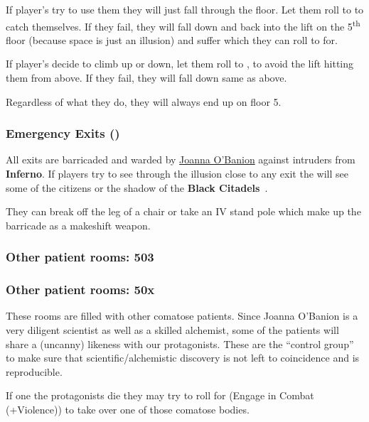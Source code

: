 \documentclass[bg-full]{resources/stylesheets/kult}
\begin{document}
If player's try to use them they will just fall through the floor.  Let them roll to  to catch
themselves.  If they fail, they will fall down and back into the lift on the 5\textsuperscript{th} floor (because space is
just an illusion) and suffer  which they can roll to  for.

If player's decide to climb up or down, let them roll to , to avoid the lift hitting them from
above.  If they fail, they will fall down same as above.

Regardless of what they do, they will always end up on floor 5.

\subsubsection{Emergency Exits (\faLock)}%
\label{ssub:emergency_exits}

All exits are barricaded and warded by \hyperref[ssub:joanna_o_banion]{Joanna O'Banion} against intruders from \textbf{Inferno}.
If players try to see through the illusion close to any exit the will see some of the citizens or the shadow of the
\textbf{Black Citadels}~\cite[p.316]{KULT:core}.

They can break off the leg of a chair or take an IV stand pole which make up the barricade as a makeshift weapon.

\subsubsection{Other patient rooms: 503}%
\label{ssub:other_patient_rooms_503}

\subsubsection{Other patient rooms: 50x}%
\label{ssub:other_patient_rooms}
These rooms are filled with other comatose patients.  Since Joanna O'Banion is a very diligent scientist as well as a skilled
alchemist, some of the patients will share a (uncanny) likeness with our protagonists.  These are the “control group” to make
sure that scientific/alchemistic discovery is not left to coincidence and is reproducible.

If one the protagonists die they may try to roll for \bluebf(Engage in Combat (+Violence)) to take over one of those comatose
bodies.
\end{document}
